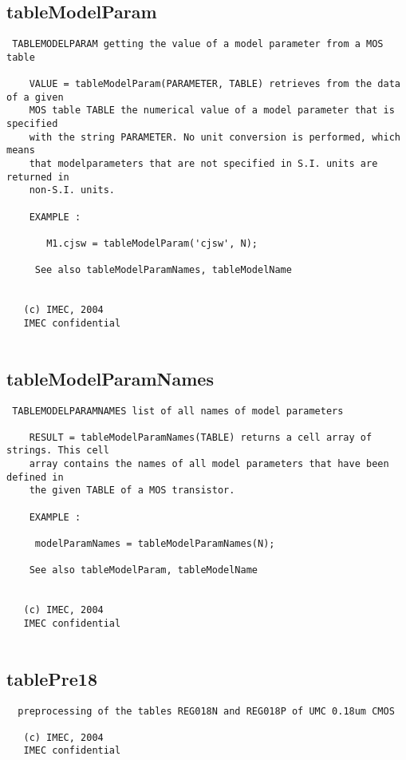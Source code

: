 \newpage
\subsection{tableModelParam}
\label{sec:tableModelParam}
\begin{verbatim}
 TABLEMODELPARAM getting the value of a model parameter from a MOS table
 
    VALUE = tableModelParam(PARAMETER, TABLE) retrieves from the data of a given
    MOS table TABLE the numerical value of a model parameter that is specified
    with the string PARAMETER. No unit conversion is performed, which means
    that modelparameters that are not specified in S.I. units are returned in
    non-S.I. units.
 
    EXAMPLE :
 
       M1.cjsw = tableModelParam('cjsw', N);
 
     See also tableModelParamNames, tableModelName
 
 
   (c) IMEC, 2004
   IMEC confidential 
 

\end{verbatim}

\newpage
\subsection{tableModelParamNames}
\label{sec:tableModelParamNames}
\begin{verbatim}
 TABLEMODELPARAMNAMES list of all names of model parameters 
 
    RESULT = tableModelParamNames(TABLE) returns a cell array of strings. This cell
    array contains the names of all model parameters that have been defined in
    the given TABLE of a MOS transistor.
 
    EXAMPLE :
 
     modelParamNames = tableModelParamNames(N);
 
    See also tableModelParam, tableModelName
 
 
   (c) IMEC, 2004
   IMEC confidential 
 

\end{verbatim}

\newpage
\subsection{tablePre18}
\label{sec:tablePre18}
\begin{verbatim}
  preprocessing of the tables REG018N and REG018P of UMC 0.18um CMOS
 
   (c) IMEC, 2004
   IMEC confidential 
 

\end{verbatim}

